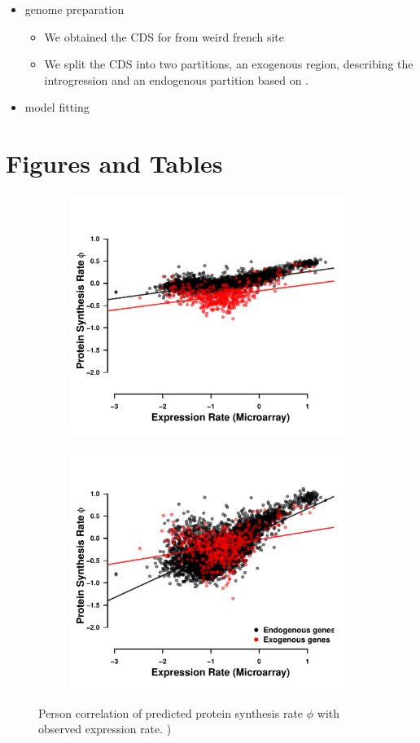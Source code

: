 \documentclass[12pt]{article}
\begin{document}
\begin{itemize}
	\item \kluyveri genome preparation
	\begin{itemize}
		\item We obtained the CDS for \kluyveri from weird french site
		\item We split the CDS into two partitions, an exogenous region, describing the introgression and an endogenous partition based on \citep{payen2009}.
	\end{itemize}
	\item \kluyveri model fitting

\end{itemize}






\section*{Figures and Tables}

\begin{figure}[H]
    \centering
    \begin{subfigure}
        \centering
        \includegraphics[width=.45\textwidth]{img/phi_corr_plot_whole_Genome_estim.pdf}
    \end{subfigure}
    \begin{subfigure}
        \centering
        \includegraphics[width=.45\textwidth]{img/phi_corr_plot_split_Genome_estim.pdf}
    \end{subfigure}
    \caption{Person correlation of predicted protein synthesis rate $\phi$ with observed expression rate. )}
    \label{fig:phi_corr_two_cond}
\end{figure}
\end{document}

